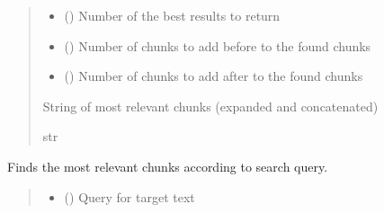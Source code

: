 \documentclass[letterpaper,10pt,english]{sphinxmanual}
\begin{document}
\begin{fulllineitems}
\begin{fulllineitems}
\begin{quote}
\begin{description}
\begin{itemize}
\item {} 
\sphinxAtStartPar
{} () \textendash{} Number of the best results to return

\item {} 
\sphinxAtStartPar
{} () \textendash{} Number of chunks to add before to the found chunks

\item {} 
\sphinxAtStartPar
{} () \textendash{} Number of chunks to add after to the found chunks

\end{itemize}

\sphinxAtStartPar
String of most relevant chunks (expanded and concatenated)

\sphinxAtStartPar
str

\end{description}\end{quote}

\end{fulllineitems}


\begin{fulllineitems}
\label{\detokenize{vector_database:vector_database.VectorDatabase.get_relevant_chunks}}
\pysigstartsignatures
\pysiglinewithargsret
{}
{\sphinxparamcomma {}}
{}
\pysigstopsignatures
\sphinxAtStartPar
Finds the most relevant chunks according to search query.
\begin{quote}\begin{description}
\begin{itemize}
\item {} 
\sphinxAtStartPar
{} () \textendash{} Query for target text


\end{itemize}
\end{description}
\end{quote}
\end{fulllineitems}
\end{fulllineitems}
\end{document}
